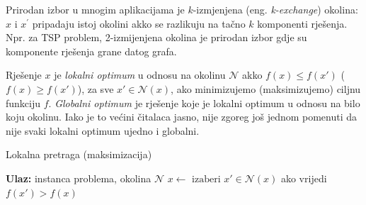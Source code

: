 \documentclass[a4paper, utf8, 11pt, colorlinks]{book}
\theoremstyle{definition}
\begin{document}
Prirodan izbor u mnogim aplikacijama je $k$-izmjenjena (eng. \emph{k-exchange}) okolina: $x$ i $x^{'}$ pripadaju istoj okolini akko se razlikuju na tačno $k$ komponenti rješenja. Npr. za TSP problem, 2-{izmijenjena} okolina je prirodan izbor gdje su komponente rješenja grane datog grafa.  

  
Rješenje $x$ je \emph{lokalni optimum} u odnosu na okolinu $\mathcal{N}$ akko
$f(x) \leq f(x')$ ($f(x) \geq f(x')$), za sve $x' \in \mathcal{N}(x)$, ako minimizujemo (maksimizujemo) ciljnu funkciju $f$.  \emph{Globalni optimum} je rješenje koje je lokalni optimum u odnosu na bilo koju okolinu.  Iako je to većini čitalaca jasno, nije zgoreg  još jednom pomenuti da nije svaki lokalni optimum ujedno i globalni. 

\begin{algorithm}[!t] 
	\caption{Lokalna pretraga (maksimizacija)}\label{alg:ls}
	\begin{algorithmic}[1]
		\STATE \textbf{Ulaz:} instanca problema, okolina $\mathcal{N}$
		\STATE $ x \gets  \text{ izaberi } x' \in \mathcal{N}(x) $ ako vrijedi  $f(x') > f(x)$ 
		\ENDWHILE
	\end{algorithmic}
\end{algorithm}
\end{document}

